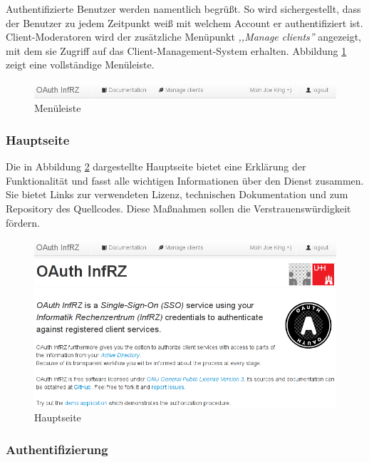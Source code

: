 \documentclass[12pt,a4paper,pointednumbers,abstracton]{scrartcl}
\begin{document}
Authentifizierte Benutzer werden namentlich begrüßt.
So wird sichergestellt, dass der Benutzer zu jedem Zeitpunkt weiß mit welchem Account er authentifiziert ist.
Client-Moderatoren wird der zusätzliche Menüpunkt \emph{,,Manage clients''} angezeigt, mit dem sie Zugriff auf das Client-Management-System erhalten.
Abbildung \ref{pic:oauth_infrz/navbar} zeigt eine vollständige Menüleiste.

\begin{figure}[h!]
\centering
\includegraphics[width=15cm]{img/oauth_infrz/navbar}
\caption{Menüleiste}
\label{pic:oauth_infrz/navbar}
\end{figure}

\subsubsection{Hauptseite}

Die in Abbildung \ref{pic:oauth_infrz/home} dargestellte Hauptseite bietet eine Erklärung der Funktionalität und fasst alle wichtigen Informationen über den Dienst zusammen.
Sie bietet Links zur verwendeten Lizenz, technischen Dokumentation und zum Repository des Quellcodes.
Diese Maßnahmen sollen die Verstrauenswürdigkeit fördern.

\begin{figure}[h!]
\centering
\includegraphics[width=15cm]{img/oauth_infrz/home}
\caption{Hauptseite}
\label{pic:oauth_infrz/home}
\end{figure}

\subsubsection{Authentifizierung}
\end{document}
